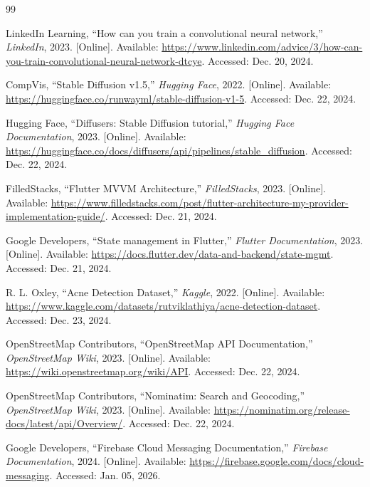 \documentclass[12pt]{report}
\begin{document}
\clearpage
  \begin{thebibliography}{99}

LinkedIn Learning, ``How can you train a convolutional neural network,'' \textit{LinkedIn}, 2023. [Online]. Available: \url{https://www.linkedin.com/advice/3/how-can-you-train-convolutional-neural-network-dtcye}. Accessed: Dec. 20, 2024.

CompVis, ``Stable Diffusion v1.5,'' \textit{Hugging Face}, 2022. [Online]. Available: \url{https://huggingface.co/runwayml/stable-diffusion-v1-5}. Accessed: Dec. 22, 2024.

Hugging Face, ``Diffusers: Stable Diffusion tutorial,'' \textit{Hugging Face Documentation}, 2023. [Online]. Available: \url{https://huggingface.co/docs/diffusers/api/pipelines/stable_diffusion}. Accessed: Dec. 22, 2024.

FilledStacks, ``Flutter MVVM Architecture,'' \textit{FilledStacks}, 2023. [Online]. Available: \url{https://www.filledstacks.com/post/flutter-architecture-my-provider-implementation-guide/}. Accessed: Dec. 21, 2024.

Google Developers, ``State management in Flutter,'' \textit{Flutter Documentation}, 2023. [Online]. Available: \url{https://docs.flutter.dev/data-and-backend/state-mgmt}. Accessed: Dec. 21, 2024.

R. L. Oxley, ``Acne Detection Dataset,'' \textit{Kaggle}, 2022. [Online]. Available: \url{https://www.kaggle.com/datasets/rutviklathiya/acne-detection-dataset}. Accessed: Dec. 23, 2024.

OpenStreetMap Contributors, ``OpenStreetMap API Documentation,'' \textit{OpenStreetMap Wiki}, 2023. [Online]. Available: \url{https://wiki.openstreetmap.org/wiki/API}. Accessed: Dec. 22, 2024.

OpenStreetMap Contributors, ``Nominatim: Search and Geocoding,'' \textit{OpenStreetMap Wiki}, 2023. [Online]. Available: \url{https://nominatim.org/release-docs/latest/api/Overview/}. Accessed: Dec. 22, 2024.

Google Developers, ``Firebase Cloud Messaging Documentation,'' \textit{Firebase Documentation}, 2024. [Online]. Available: \url{https://firebase.google.com/docs/cloud-messaging}. Accessed: Jan. 05, 2026.

\end{thebibliography}


\end{document}
